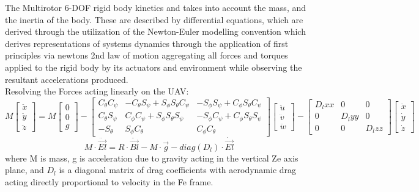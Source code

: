 \documentclass[12pt,a4paper,twoside]{report}
\begin{document}
					The Multirotor 6-DOF rigid body kinetics and takes into account the mass, and the inertia of the body. These are described by differential equations, which are derived through the utilization of the Newton-Euler modelling convention which derives representations of systems dynamics through the application of first principles via newtons 2nd law of motion aggregating all forces and torques applied to the rigid body by its actuators and environment while observing the resultant accelerations produced.
					\\
					Resolving the Forces acting linearly on the UAV:
					\\
					$$ 
					M 
					\begin{bmatrix}
						\ddot{x} \\
						\ddot{y} \\
						\ddot{z}
					\end{bmatrix}
					=
					M 
					\begin{bmatrix}
						0 \\
						0 \\
						g
					\end{bmatrix}
					-
					\begin{bmatrix}
						C_\theta C_\psi & -C_\theta S_\psi + S_\phi S_\theta C_\psi & -S_\phi S_\psi + C_\phi S_\theta C_\psi \\
						C_\theta S_\psi &  C_\phi C_\psi + S_\phi S_\theta S_\psi   & -S_\phi C_\psi + C_\phi S_\theta S_\psi \\
						-S_\theta       &  S_\phi C_\theta                          &  C_\phi C_\theta
					\end{bmatrix}
					\begin{bmatrix}
						\ddot{u} \\
						\ddot{v} \\
						\ddot{w} 
					\end{bmatrix}
					-
					\begin{bmatrix}
						D_lxx & 0 & 0 \\
						0 & D_lyy & 0 \\
						0 & 0 & D_lzz
					\end{bmatrix}
					\begin{bmatrix}
						\dot{x} \\
						\dot{y} \\
						\dot{z} 
					\end{bmatrix}
					$$ 
					\[ M \cdot \ddot{\vec{El}} = R \cdot \ddot{\vec{Bl}} - M \cdot \vec{g} - diag(D_l) \cdot \dot{\vec{El}}\] 
					where M is mass, g is acceleration due to gravity acting in the vertical Ze axis plane, and \(D_l\) is a diagonal matrix of drag coefficients with aerodynamic drag acting directly proportional to velocity in the Fe frame.
\end{document}
